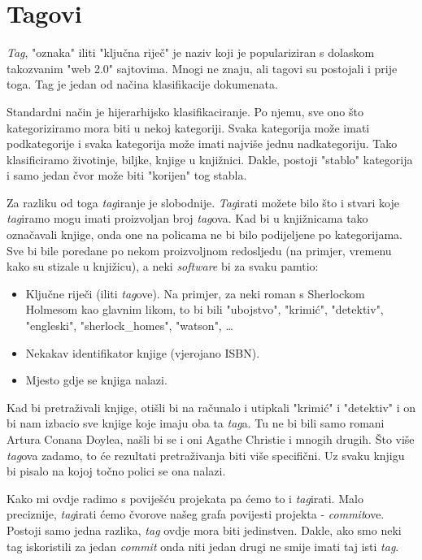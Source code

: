 \chapter*{Tagovi}

\emph{Tag}, "oznaka" iliti "ključna riječ" je naziv koji je populariziran s dolaskom takozvanim "web 2.0" sajtovima. 
Mnogi ne znaju, ali tagovi su postojali i prije toga. 
Tag je jedan od načina klasifikacije dokumenata.

Standardni način je hijerarhijsko klasifikaciranje.
Po njemu, sve ono što kategoriziramo mora biti u nekoj kategoriji.
Svaka kategorija može imati podkategorije i svaka kategorija može imati najviše jednu nadkategoriju.
Tako klasificiramo životinje, biljke, knjige u knjižnici.
Dakle, postoji "stablo" kategorija i samo jedan čvor može biti "korijen" tog stabla.

Za razliku od toga \emph{tag}iranje je slobodnije.
\emph{Tag}irati možete bilo što i stvari koje \emph{tag}iramo mogu imati proizvoljan broj \emph{tag}ova.
Kad bi u knjižnicama tako označavali knjige, onda one na policama ne bi bilo podijeljene po kategorijama.
Sve bi bile poredane po nekom proizvoljnom redosljedu (na primjer, vremenu kako su stizale u knjižicu), a neki \emph{software} bi za svaku pamtio:

\begin{itemize}
	\item Ključne riječi (iliti \emph{tag}ove). Na primjer, za neki roman s Sherlockom Holmesom kao glavnim likom, to bi bili "ubojstvo", "krimić", "detektiv", "engleski", "sherlock\_homes", "watson", \dots
	\item Nekakav identifikator knjige (vjerojano ISBN).
	\item Mjesto gdje se knjiga nalazi.
\end{itemize}

Kad bi pretraživali knjige, otišli bi na računalo i utipkali "krimić" i "detektiv" i on bi nam izbacio sve knjige koje imaju oba ta \emph{tag}a.
Tu ne bi bili samo romani Artura Conana Doylea, našli bi se i oni Agathe Christie i mnogih drugih. 
Što više \emph{tag}ova zadamo, to će rezultati pretraživanja biti više specifični.
Uz svaku knjigu bi pisalo na kojoj točno polici se ona nalazi.

Kako mi ovdje radimo s poviješću projekata pa ćemo to i \emph{tag}irati.
Malo preciznije, \emph{tag}irati ćemo čvorove našeg grafa povijesti projekta - \emph{commit}ove.
Postoji samo jedna razlika, \emph{tag} ovdje mora biti jedinstven.
Dakle, ako smo neki tag iskoristili za jedan \emph{commit} onda niti jedan drugi ne smije imati taj isti \emph{tag}.

